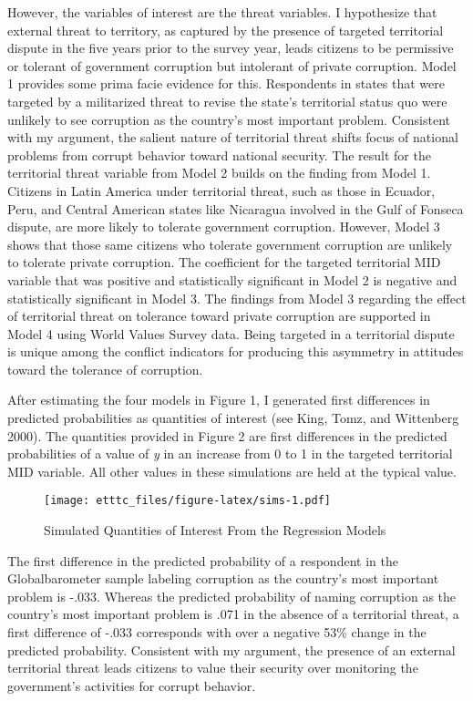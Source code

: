 \documentclass[11pt,]{article}
\begin{document}
However, the variables of interest are the threat variables. I
hypothesize that external threat to territory, as captured by the
presence of targeted territorial dispute in the five years prior to the
survey year, leads citizens to be permissive or tolerant of government
corruption but intolerant of private corruption. Model 1 provides some
prima facie evidence for this. Respondents in states that were targeted
by a militarized threat to revise the state's territorial status quo
were unlikely to see corruption as the country's most important problem.
Consistent with my argument, the salient nature of territorial threat
shifts focus of national problems from corrupt behavior toward national
security. The result for the territorial threat variable from Model 2
builds on the finding from Model 1. Citizens in Latin America under
territorial threat, such as those in Ecuador, Peru, and Central American
states like Nicaragua involved in the Gulf of Fonseca dispute, are more
likely to tolerate government corruption. However, Model 3 shows that
those same citizens who tolerate government corruption are unlikely to
tolerate private corruption. The coefficient for the targeted
territorial MID variable that was positive and statistically significant
in Model 2 is negative and statistically significant in Model 3. The
findings from Model 3 regarding the effect of territorial threat on
tolerance toward private corruption are supported in Model 4 using World
Values Survey data. Being targeted in a territorial dispute is unique
among the conflict indicators for producing this asymmetry in attitudes
toward the tolerance of corruption.

After estimating the four models in Figure 1, I generated first
differences in predicted probabilities as quantities of interest (see
King, Tomz, and Wittenberg 2000). The quantities provided in Figure 2
are first differences in the predicted probabilities of a value of
\emph{y} in an increase from 0 to 1 in the targeted territorial MID
variable. All other values in these simulations are held at the typical
value.

\begin{figure}[htbp]
\centering
\texttt{[image: etttc\_files/figure-latex/sims-1.pdf]}
\caption{Simulated Quantities of Interest From the Regression Models}
\end{figure}

The first difference in the predicted probability of a respondent in the
Globalbarometer sample labeling corruption as the country's most
important problem is -.033. Whereas the predicted probability of naming
corruption as the country's most important problem is .071 in the
absence of a territorial threat, a first difference of -.033 corresponds
with over a negative 53\% change in the predicted probability.
Consistent with my argument, the presence of an external territorial
threat leads citizens to value their security over monitoring the
government's activities for corrupt behavior.
\end{document}
